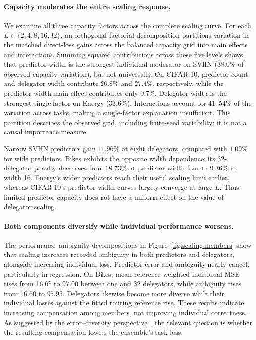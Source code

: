 \paragraph{Capacity moderates the entire scaling response.}
We examine all three capacity factors across the complete scaling curve.
For each $L\in\{2,4,8,16,32\}$, an orthogonal factorial decomposition partitions
variation in the matched direct-loss gains across the balanced capacity grid
into main effects and interactions. Summing squared contributions across these
five levels shows that predictor width is the strongest individual moderator
on SVHN (38.0\% of observed capacity variation), but not universally.
On CIFAR-10, predictor count and delegator width contribute 26.8\% and 27.4\%,
respectively, while the predictor-width main effect contributes only 0.7\%.
Delegator width is the strongest single factor on Energy (33.6\%).
Interactions account for 41--54\% of the variation across tasks, making a
single-factor explanation insufficient. This partition describes the observed
grid, including finite-seed variability; it is not a causal importance measure.

Narrow SVHN predictors gain $11.96\%$ at eight delegators, compared with
$1.09\%$ for wide predictors. Bikes exhibits the opposite width dependence:
its 32-delegator penalty decreases from $18.73\%$ at predictor width four to
$9.36\%$ at width 16. Energy's wider predictors reach their useful scaling
limit earlier, whereas CIFAR-10's predictor-width curves largely converge
at large $L$. Thus limited predictor capacity does not have a uniform effect
on the value of delegator scaling.

\paragraph{Both components diversify while individual performance worsens.}
The performance--ambiguity decompositions in Figure~\ref{fig:scaling-members}
show that scaling increases recorded ambiguity in both predictors and
delegators, alongside increasing individual loss. Predictor error and
ambiguity nearly cancel, particularly in regression. On Bikes, mean
reference-weighted individual MSE rises from 16.65 to 97.00 between one and
32 delegators, while ambiguity rises from 16.60 to 96.95. Delegators likewise
become more diverse while their individual losses against the fitted routing
reference rise. These results indicate increasing compensation among members,
not improving individual correctness. As suggested by the error--diversity
perspective~\citep{wood2023unified}, the relevant question is whether the
resulting compensation lowers the ensemble's task loss.

